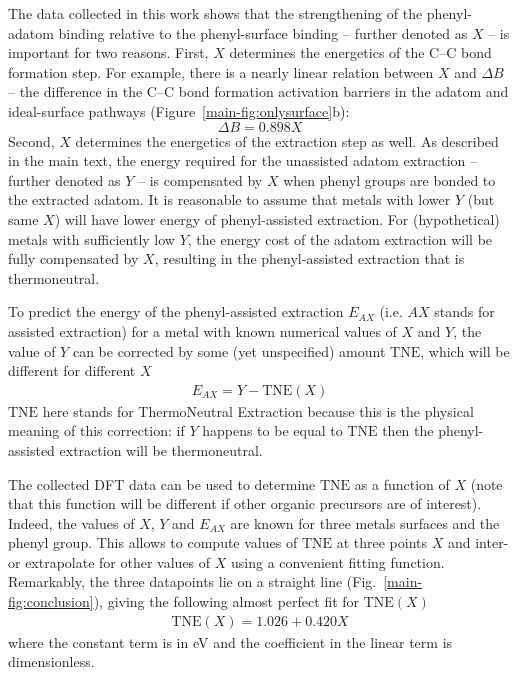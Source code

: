 \documentclass[journal=jpclcd,layout=traditional,manuscript=letter]{achemso} %
\begin{document}
The data collected in this work shows that the strengthening of the phenyl-adatom binding relative to the phenyl-surface binding -- further denoted as $X$ -- is important for two reasons. First, $X$ determines the energetics of the C--C bond formation step. For example, there is a nearly linear relation between $X$ and $\Delta B$ -- the difference in the C--C bond formation activation barriers in the adatom and ideal-surface pathways (Figure~\ref{main-fig:onlysurface}b):
% 
\begin{equation} \label{eq:relation1}
\Delta B = 0.898 X
\end{equation}
%
Second, $X$ determines the energetics of the extraction step as well. As described in the main text, the energy required for the unassisted adatom extraction -- further denoted as $Y$ -- is compensated by $X$ when phenyl groups are bonded to the extracted adatom. It is reasonable to assume that metals with lower $Y$ (but same $X$) will have lower energy of phenyl-assisted extraction. For (hypothetical) metals with sufficiently low $Y$, the energy cost of the adatom extraction will be fully compensated by $X$, resulting in the phenyl-assisted extraction that is thermoneutral. 

To predict the energy of the phenyl-assisted extraction $E_{AX}$ (i.e. $AX$ stands for assisted extraction) for a metal with known numerical values of $X$ and $Y$, the value of $Y$ can be corrected by some (yet unspecified) amount $\text{TNE}$, which will be different for different $X$
%
\begin{equation} \label{eq:relation2}
\begin{split}
E_{AX} = Y - \text{TNE}(X)
\end{split}
\end{equation}
%
$\text{TNE}$ here stands for ThermoNeutral Extraction because this is the physical meaning of this correction: if $Y$ happens to be equal to $\text{TNE}$ then the phenyl-assisted extraction will be thermoneutral.

The collected DFT data can be used to determine $\text{TNE}$ as a function of $X$ (note that this function will be different if other organic precursors are of interest). Indeed, the values of $X$, $Y$ and $E_{AX}$ are known for three metals surfaces and the phenyl group. This allows to compute values of $\text{TNE}$ at three points $X$ and inter- or extrapolate for other values of $X$ using a convenient fitting function. Remarkably, the three datapoints lie on a straight line (Fig.~\ref{main-fig:conclusion}), giving the following almost perfect fit for $\text{TNE}(X)$
%
\begin{equation} \label{eq:TNEfit}
\begin{split}
\text{TNE}(X) = 1.026 + 0.420 X
\end{split}
\end{equation}
%
where the constant term is in \si{\electronvolt} and the coefficient in the linear term is dimensionless. 
\end{document}
